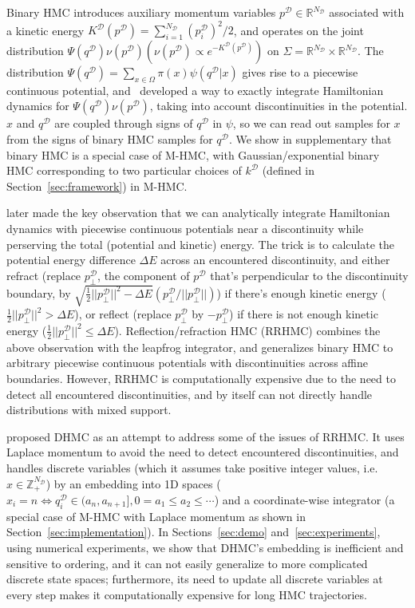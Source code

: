 \documentclass{article}
\newcommand{\cald}{\mathcal{D}}
\begin{document}
Binary HMC introduces auxiliary momentum variables $p^\cald\in\mathbb{R}^{N_\cald}$ associated with a kinetic energy $K^\cald(p^\cald)=\sum_{i=1}^{N_\cald}(p^\cald_i)^2 / 2$, and operates on the joint distribution $\Psi(q^\cald)\nu(p^\cald) (\nu(p^\cald)\propto e^{-K^\cald(p^\cald)})$ on $\Sigma=\mathbb{R}^{N_\cald}\times\mathbb{R}^{N_\cald}$. The distribution $\Psi(q^\cald)=\sum_{x\in\Omega}\pi(x)\psi(q^\cald | x)$ gives rise to a piecewise continuous potential, and~\cite{Pakman2013-gi} developed a way to exactly integrate Hamiltonian dynamics for $\Psi(q^\cald)\nu(p^\cald)$, taking into account discontinuities in the potential. $x$ and $q^\cald$ are coupled through signs of $q^\cald$ in $\psi$, so we can read out samples for $x$ from the signs of binary HMC samples for $q^\cald$. We show in supplementary that binary HMC is a special case of M-HMC, with Gaussian/exponential binary HMC corresponding to two particular choices of $k^\cald$ (defined in Section~\ref{sec:framework}) in M-HMC.

\cite{Mohasel_Afshar2015-uh} later made the key observation that we can analytically integrate Hamiltonian dynamics with piecewise continuous potentials near a discontinuity while perserving the total (potential and kinetic) energy. The trick is to calculate the potential energy difference $\Delta E$ across an encountered discontinuity, and either refract (replace $p^\cald_\perp$, the component of $p^\cald$ that's perpendicular to the discontinuity boundary, by $\sqrt{\frac{1}{2}||p^\cald_\perp||^2 - \Delta E} (p^\cald_\perp/||p^\cald_\perp||)$) if there's enough kinetic energy ($\frac{1}{2}||p^\cald_\perp||^2 > \Delta E$), or reflect (replace $p^\cald_\perp$ by $-p^\cald_\perp$) if there is not enough kinetic energy ($\frac{1}{2}||p^\cald_\perp||^2 \leq \Delta E$). Reflection/refraction HMC (RRHMC) combines the above observation with the leapfrog integrator, and generalizes binary HMC to arbitrary piecewise continuous potentials with discontinuities across affine boundaries. However, RRHMC is computationally expensive due to the need to detect all encountered discontinuities, and by itself can not directly handle distributions with mixed support.

\cite{Nishimura2017-wv} proposed DHMC as an attempt to address some of the issues of RRHMC. It uses Laplace momentum to avoid the need to detect encountered discontinuities, and handles discrete variables (which it assumes take positive integer values, i.e. $x\in\mathbb{Z}_+^{N_\cald}$) by an embedding into 1D spaces ($x_i = n \iff q^\cald_i\in(a_n, a_{n+1}], 0=a_1 \leq a_2 \leq \cdots$) and a coordinate-wise integrator (a special case of M-HMC with Laplace momentum as shown in Section~\ref{sec:implementation}). In Sections~\ref{sec:demo} and~\ref{sec:experiments}, using numerical experiments, we show that DHMC's embedding is inefficient and sensitive to ordering, and it can not easily generalize to more complicated discrete state spaces; furthermore, its need to update all discrete variables at every step makes it computationally expensive for long HMC trajectories.
\end{document}
